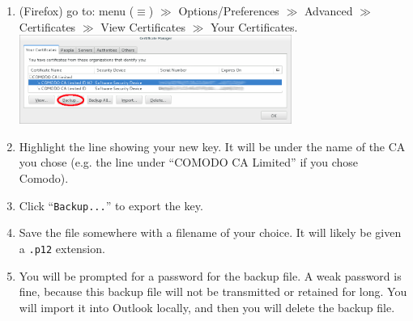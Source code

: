 \documentclass[pdftex,12pt,titlepage=false]{scrartcl}
\begin{document}
\begin{enumerate}
  \item (Firefox) go to: menu ($\equiv$) $\gg$ Options/Preferences $\gg$ Advanced
  $\gg$ Certificates $\gg$ View Certificates $\gg$ Your Certificates.\\[1em]%
  \includegraphics[width=0.7\textwidth]{images/firefox_cert_settings.png}
\item Highlight the line showing your new key.  It will be under the
  name of the CA you chose (e.g. the line under ``COMODO CA Limited''
  if you chose Comodo).
\item %
  Click ``\texttt{Backup...}'' to export the key.
\item Save the file somewhere with a filename of your choice.  It will
  likely be given a \verb|.p12| extension.
\item\label{makebupw} You will be prompted for a password for the
  backup file.  A weak password is fine, because this backup file will
  not be transmitted or retained for long.  You will import it into
  Outlook locally, and then you will delete the backup file.
\end{enumerate}
\end{document}
